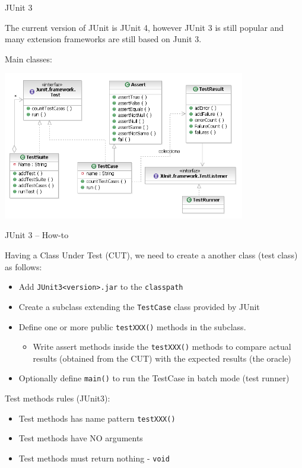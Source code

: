 \documentclass[11pt, xcolor=svgnames]{beamer}
\begin{document}
\begin{frame}{JUnit 3}

The current version of JUnit is JUnit 4, however JUnit 3 is still popular and many extension frameworks are still based on Junit 3. 

Main classes: 

\begin{center}
 \includegraphics[width=300pt]{./figs/UMLJUnit3}
\end{center}

\end{frame}



\begin{frame}{JUnit 3 -- How-to}

Having a Class Under Test (CUT), we need to create a another class (test class) as follows:

\begin{itemize}
 \item Add \texttt{JUnit3<version>.jar} to the \texttt{classpath}
 \item Create a subclass extending the \texttt{TestCase} class provided by JUnit
 \item Define one or more public \texttt{testXXX()} methods in the subclass.
 \begin{itemize}
  \item Write assert methods inside the \texttt{testXXX()} methods to compare actual results (obtained from the CUT) with the expected results (the oracle)
 \end{itemize}
 \item Optionally define \texttt{main()} to run the TestCase in batch mode (test runner)
\end{itemize}

Test methods rules (JUnit3):
\begin{itemize}
 \item Test methods has name pattern \texttt{testXXX()}
 \item Test methods have NO arguments
 \item Test methods must return nothing - \texttt{void}
\end{itemize}

\end{frame}
\end{document}
